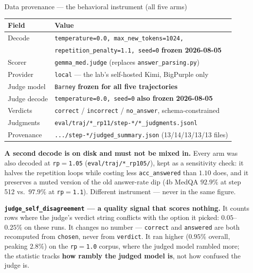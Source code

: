 \documentclass[aspectratio=169,10pt]{beamer}
\newcommand{\good}[1]{\textcolor{up}{#1}}
\newcommand{\bad}[1]{\textcolor{down}{#1}}
\begin{document}
\begin{frame}{Data provenance --- the behavioral instrument (all five arms)}
  \small
  \begin{tabular}{ll}
    \toprule
    Field & Value \\
    \midrule
    Decode     & \texttt{temperature=0.0, max\_new\_tokens=1024,} \\
               & \texttt{repetition\_penalty=1.1, seed=0} \; \textbf{frozen 2026-08-05} \\
    Scorer     & \texttt{gemma\_med.judge} (replaces \texttt{answer\_parsing.py}) \\
    Provider   & \texttt{local} --- the lab's self-hosted Kimi, BigPurple only \\
    Judge model& \texttt{Barney} \; \textbf{frozen for all five trajectories} \\
    Judge decode& \texttt{temperature=0.0, seed=0} \; \textbf{also frozen 2026-08-05} \\
    Verdicts   & \texttt{correct} / \texttt{incorrect} / \texttt{no\_answer},
                 schema-constrained \\
    Judgments  & \texttt{eval/traj/*\_rp11/step-*/*\_judgments.jsonl} \\
    Provenance & \texttt{.../step-*/judged\_summary.json} (13/14/13/13/13 files) \\
    \bottomrule
  \end{tabular}

  \vspace{0.6em}
  {\scriptsize
  \textbf{A second decode is on disk and must not be mixed in.} Every arm was
  also decoded at \texttt{rp}$=$\texttt{1.05} (\texttt{eval/traj/*\_rp105/}),
  kept as a sensitivity check: it halves the repetition loops while costing less
  \texttt{acc\_answered} than $1.10$ does, and it preserves a muted version of
  the old answer-rate dip (4b MedQA $92.9\%$ at step 512 vs.\ $97.9\%$ at
  \texttt{rp}$=$\texttt{1.1}). \bad{Different instrument --- never in the same
  figure.}

  \smallskip
  \textbf{\texttt{judge\_self\_disagreement} --- a quality signal that scores
  nothing.} It counts rows where the judge's verdict string conflicts with the
  option it picked: $0.05$--$0.25\%$ on these runs. \good{It changes no number}
  --- \texttt{correct} and \texttt{answered} are both recomputed from
  \texttt{chosen}, never from \texttt{verdict}. It ran higher
  ($0.95\%$ overall, peaking $2.8\%$) on the \texttt{rp}$=$\texttt{1.0} corpus,
  where the judged model rambled more; the statistic tracks \textbf{how rambly
  the judged model is}, not how confused the judge is.}
\end{frame}
\end{document}
